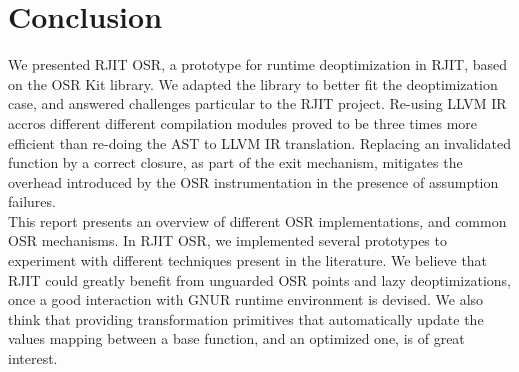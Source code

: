 
\chapter{Conclusion} %

\label{Chapter6} %


\newcommand{\keyword}[1]{\textbf{#1}}
\newcommand{\tabhead}[1]{\textbf{#1}}
\newcommand{\code}[1]{\texttt{#1}}
\newcommand{\file}[1]{\texttt{\bfseries#1}}
\newcommand{\option}[1]{\texttt{\itshape#1}}


  

We presented RJIT OSR, a prototype for runtime deoptimization in RJIT, based on the OSR Kit library\cite{OSRKit}.
We adapted the library to better fit the deoptimization case, and answered challenges particular to the RJIT project.
Re-using LLVM IR accros different different compilation modules proved to be three times more efficient than re-doing the AST to LLVM IR translation.
Replacing an invalidated function by a correct closure, as part of the exit mechanism, mitigates the overhead introduced by the OSR instrumentation in the presence of assumption failures.\\

This report presents an overview of different OSR implementations, and common OSR mechanisms.
In RJIT OSR, we implemented several prototypes to experiment with different techniques present in the literature.
We believe that RJIT could greatly benefit from unguarded OSR points and lazy deoptimizations, once a good interaction with GNUR runtime environment is devised.
We also think that providing transformation primitives that automatically update the values mapping between a base function, and an optimized one, is of great interest.\\

